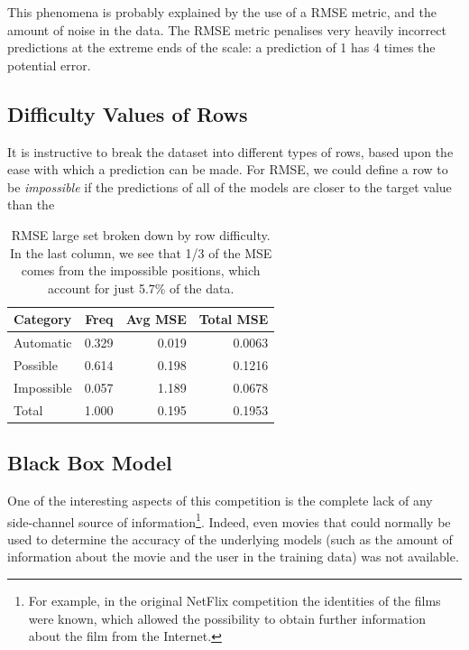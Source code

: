 \documentclass{article}
\begin{document}
This phenomena is probably explained by the use of a RMSE metric, and the amount of noise in the data.  The RMSE metric penalises very heavily incorrect predictions at the extreme ends of the scale: a prediction of 1 has 4 times the potential error.

\subsection{Difficulty Values of Rows}

It is instructive to break the dataset into different types of rows, based upon the ease with which a prediction can be made.  For RMSE, we could define a row to be \emph{impossible} if the predictions of all of the models are closer to the target value than the

\begin{table}[t]
\caption{RMSE large set broken down by row difficulty.  In the last column, we see that 1/3 of the MSE comes from the impossible positions, which account for just 5.7\% of the data.}
\label{rowtypesrmse}
\vskip 0.15in
\begin{center}
\begin{small}
\begin{sc}
\begin{tabular}{lrrr}
\hline
\abovespace\belowspace
Category & Freq & Avg MSE & Total MSE \\
\hline
\abovespace
Automatic     & 0.329 & 0.019 & 0.0063 \\
Possible      & 0.614 & 0.198 & 0.1216 \\
Impossible    & 0.057 & 1.189 & 0.0678 \\
\abovespace\belowspace
Total         & 1.000 & 0.195 & 0.1953 \\
\hline
\end{tabular}
\end{sc}
\end{small}
\end{center}
\vskip -0.1in
\end{table}




\subsection{Black Box Model}



One of the interesting aspects of this competition is the complete lack of any
side-channel source of information\footnote{For example, in the original NetFlix
competition the identities of the films were known, which allowed the
possibility to obtain further information about the film from the Internet.}.  Indeed, even movies that could normally be used to determine the accuracy of the underlying models (such as the amount of information about the movie and the user in the training data) was not available.
\end{document}
